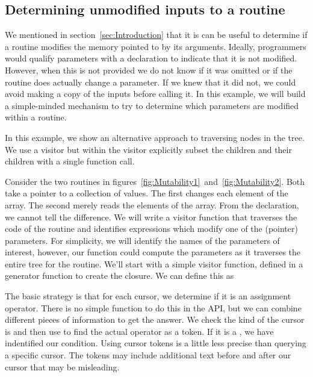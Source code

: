 \subsection{Determining unmodified inputs to a routine}\label{sec:MutabilityEg}

We mentioned in section~\ref{sec:Introduction} that it is can be
useful to determine if a routine modifies the memory pointed to by its
arguments.  Ideally, programmers would qualify parameters with a
 declaration to indicate that it is not
modified. However, when this is not provided we do not know if it was
omitted or if the routine does actually change a parameter.
If we knew that it did not, we could avoid making a copy
of the inputs before calling it. 
In this example, we will build a simple-minded mechanism to try to
determine which parameters are modified within a routine.



In this example, we show an alternative approach to traversing nodes
in the tree. We use a visitor but within the visitor explicitly
subset the children and their children with a single function call.

Consider the two routines in
figures~\ref{fig:Mutability1}~and~\ref{fig:Mutability2}.  Both take a
pointer to a collection of  values.  The first changes
each element of the array. The second merely reads the elements of the
array. From the declaration, we cannot tell the difference.  We will
write a visitor function that traverses the code of the routine and
identifies expressions which modify one of the (pointer) parameters.
For simplicity, we will identify the names of the parameters of
interest, however, our function could compute the parameters as it
traverses the entire tree for the routine.  We'll start with a simple
visitor function, defined in a generator function to create the
closure. We can define this as 

The basic strategy is that for each cursor, we determine if it is an
assignment operator. There is no simple function to do this in the
\libclang{} API, but we can combine different pieces of information to
get the answer. We check the kind of the cursor is
 and then use  to
find the actual operator as a token.  If it is a \dquote{=}, we have
indentified our condition.  Using cursor tokens is a little less
precise than querying a specific cursor. The tokens may include
additional text before and after our cursor that may be misleading.

